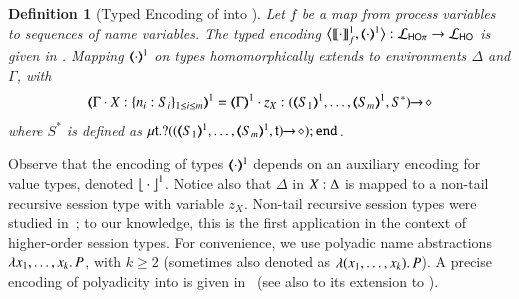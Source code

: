 \documentclass[preprint,11pt]{elsarticle}
\newtheorem{definition}{Definition}[section]
\begin{document}
{{%

\begin{definition}[Typed Encoding of \HOp into \HO]
\label{d:enc:hopitoho}
Let $f$ be a map from process variables to sequences of name variables.
%
The typed encoding 
$\enco{\map{\cdot}^{1}_f, \mapt{\cdot}^{1} %
}: \tyl{L}_{\HOp} \to \tyl{L}_{\HO}$ is given in 
. 
Mapping $(\!\!\langle\cdot\rangle\!\!)^{1}$ on types homomorphically extends to 
environments $\Delta$
and
$\Gamma$, with
$$
\tmap{\Gamma \cat \varp{X}:\{n_i:S_i\}_{1\leq i\leq m}}{1}  
=  
\tmap{\Gamma}{1} \cat z_X:\shot{(\tmap{S_1}{1},\ldots,\tmap{S_m}{1},S^*)}
$$ 
where  
$S^*$ is defined as $\trec{t}{\btinp{\shot{(\tmap{S_1}{1},\ldots,\tmap{S_m}{1},\vart{t})}} \tinact}$.
\end{definition}



Observe that the encoding of types $(\!\!\langle\cdot\rangle\!\!)^{1}$ depends on an auxiliary encoding 
for value types, denoted ${\big\lfloor \cdot\big\rfloor^{1}}$.
Notice also that $\Delta$ in $X:\Delta$ is mapped to a non-tail
recursive session type with variable $z_X$. %
Non-tail
recursive session types {were} studied in~\cite{DBLP:journals/corr/abs-1202-2086,TGC14};
{to our knowledge,}
this is the first application in the
context of higher-order session types.
For convenience,  %
we use polyadic name abstractions $\lambda x_1, \ldots, x_k.\,P$, with $k \geq 2$ (sometimes also denoted as $\lambda (x_1, \ldots, x_k).\,P$).
A precise encoding of polyadicity into \HOp is given in~ (see also  to its extension to \HO).

}}
\end{document}
